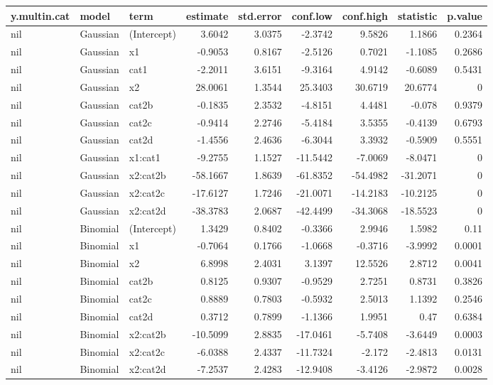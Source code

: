 \documentclass[a4paper]{article}
\begin{document}
\begin{center}
\begin{tabular}{lllrrrrrr}
y.multin.cat & model & term & estimate & std.error & conf.low & conf.high & statistic & p.value\\
\hline
nil & Gaussian & (Intercept) & 3.6042 & 3.0375 & -2.3742 & 9.5826 & 1.1866 & 0.2364\\
nil & Gaussian & x1 & -0.9053 & 0.8167 & -2.5126 & 0.7021 & -1.1085 & 0.2686\\
nil & Gaussian & cat1 & -2.2011 & 3.6151 & -9.3164 & 4.9142 & -0.6089 & 0.5431\\
nil & Gaussian & x2 & 28.0061 & 1.3544 & 25.3403 & 30.6719 & 20.6774 & 0\\
nil & Gaussian & cat2b & -0.1835 & 2.3532 & -4.8151 & 4.4481 & -0.078 & 0.9379\\
nil & Gaussian & cat2c & -0.9414 & 2.2746 & -5.4184 & 3.5355 & -0.4139 & 0.6793\\
nil & Gaussian & cat2d & -1.4556 & 2.4636 & -6.3044 & 3.3932 & -0.5909 & 0.5551\\
nil & Gaussian & x1:cat1 & -9.2755 & 1.1527 & -11.5442 & -7.0069 & -8.0471 & 0\\
nil & Gaussian & x2:cat2b & -58.1667 & 1.8639 & -61.8352 & -54.4982 & -31.2071 & 0\\
nil & Gaussian & x2:cat2c & -17.6127 & 1.7246 & -21.0071 & -14.2183 & -10.2125 & 0\\
nil & Gaussian & x2:cat2d & -38.3783 & 2.0687 & -42.4499 & -34.3068 & -18.5523 & 0\\
nil & Binomial & (Intercept) & 1.3429 & 0.8402 & -0.3366 & 2.9946 & 1.5982 & 0.11\\
nil & Binomial & x1 & -0.7064 & 0.1766 & -1.0668 & -0.3716 & -3.9992 & 0.0001\\
nil & Binomial & x2 & 6.8998 & 2.4031 & 3.1397 & 12.5526 & 2.8712 & 0.0041\\
nil & Binomial & cat2b & 0.8125 & 0.9307 & -0.9529 & 2.7251 & 0.8731 & 0.3826\\
nil & Binomial & cat2c & 0.8889 & 0.7803 & -0.5932 & 2.5013 & 1.1392 & 0.2546\\
nil & Binomial & cat2d & 0.3712 & 0.7899 & -1.1366 & 1.9951 & 0.47 & 0.6384\\
nil & Binomial & x2:cat2b & -10.5099 & 2.8835 & -17.0461 & -5.7408 & -3.6449 & 0.0003\\
nil & Binomial & x2:cat2c & -6.0388 & 2.4337 & -11.7324 & -2.172 & -2.4813 & 0.0131\\
nil & Binomial & x2:cat2d & -7.2537 & 2.4283 & -12.9408 & -3.4126 & -2.9872 & 0.0028\\

\end{tabular}
\end{center}
\end{document}

